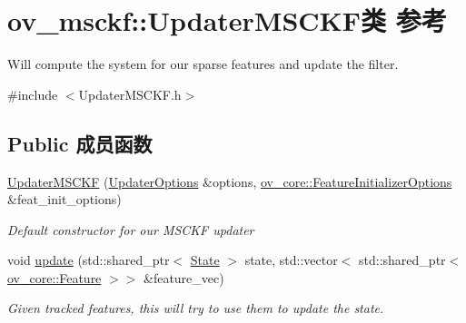 \hypertarget{classov__msckf_1_1UpdaterMSCKF}{}\section{ov\+\_\+msckf\+:\+:Updater\+M\+S\+C\+K\+F类 参考}
\label{classov__msckf_1_1UpdaterMSCKF}


Will compute the system for our sparse features and update the filter.  




{\ttfamily \#include $<$Updater\+M\+S\+C\+K\+F.\+h$>$}

\subsection*{Public 成员函数}
\begin{DoxyCompactItemize}
\item 
\hyperlink{classov__msckf_1_1UpdaterMSCKF_af8d2ffc21b0209319c7fd9a351b9d3ad}{Updater\+M\+S\+C\+KF} (\hyperlink{structov__msckf_1_1UpdaterOptions}{Updater\+Options} \&options, \hyperlink{structov__core_1_1FeatureInitializerOptions}{ov\+\_\+core\+::\+Feature\+Initializer\+Options} \&feat\+\_\+init\+\_\+options)
\begin{DoxyCompactList}\small\item\em Default constructor for our M\+S\+C\+KF updater \end{DoxyCompactList}\item 
void \hyperlink{classov__msckf_1_1UpdaterMSCKF_a4f307c56582c5fefeef298c5b54da2fd}{update} (std\+::shared\+\_\+ptr$<$ \hyperlink{classov__msckf_1_1State}{State} $>$ state, std\+::vector$<$ std\+::shared\+\_\+ptr$<$ \hyperlink{classov__core_1_1Feature}{ov\+\_\+core\+::\+Feature} $>$$>$ \&feature\+\_\+vec)
\begin{DoxyCompactList}\small\item\em Given tracked features, this will try to use them to update the state. \end{DoxyCompactList}\end{DoxyCompactItemize}
